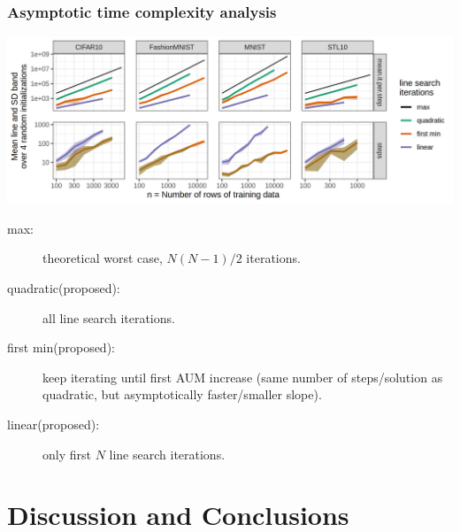 \documentclass[t]{beamer}
\begin{document}
\begin{frame}
  \frametitle{Asymptotic time complexity analysis}

  \includegraphics[width=\textwidth]{data_Classif_figure_units}

  \begin{description}
  \item[max:] theoretical worst case, $N(N-1)/2$ iterations.
  \item[quadratic(proposed):] all line search iterations.
  \item[first min(proposed):] keep iterating until first AUM increase
    (same number of steps/solution as quadratic, but asymptotically 
    faster/smaller slope).
  \item[linear(proposed):] only first $N$ line search iterations.    
  \end{description}
\end{frame}


\section{Discussion and Conclusions}
\end{document}
